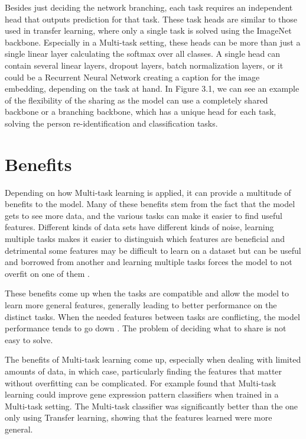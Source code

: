 Besides just deciding the network branching, each task requires an independent head that outputs prediction for that task.
These task heads are similar to those used in transfer learning, where only a single task is solved using the ImageNet backbone.
Especially in a Multi-task setting, these heads can be more than just a single linear layer calculating the softmax over all classes.
A single head can contain several linear layers, dropout layers, batch normalization layers, or it could be a Recurrent Neural Network creating a caption for the image embedding, depending on the task at hand.
In Figure 3.1, we can see an example of the flexibility of the sharing as the model can use a completely shared backbone or a branching backbone, which has a unique head for each task, solving the person re-identification and classification tasks.

\section{Benefits}
Depending on how Multi-task learning is applied, it can provide a multitude of benefits to the model.
Many of these benefits stem from the fact that the model gets to see more data, and the various tasks can make it easier to find useful features.
Different kinds of data sets have different kinds of noise, learning multiple tasks makes it easier to distinguish which features are beneficial and detrimental some features may be difficult to learn on a dataset but can be useful and borrowed from another and learning multiple tasks forces the model to not overfit on one of them \citep{ruderOverview}.

These benefits come up when the tasks are compatible and allow the model to learn more general features, generally leading to better performance on the distinct tasks.
When the needed features between tasks are conflicting, the model performance tends to go down \citep{uberNet}.
The problem of deciding what to share is not easy to solve.

The benefits of Multi-task learning come up, especially when dealing with limited amounts of data, in which case, particularly finding the features that matter without overfitting can be complicated.
For example \citep{biologicalMultitask} found that Multi-task learning could improve gene expression pattern classifiers when trained in a Multi-task setting.
The Multi-task classifier was significantly better than the one only using Transfer learning, showing that the features learned were more general.

